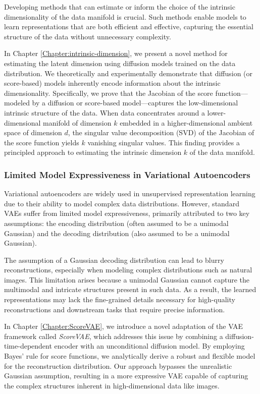 Developing methods that can estimate or inform the choice of the intrinsic dimensionality of the data manifold is crucial. Such methods enable models to learn representations that are both efficient and effective, capturing the essential structure of the data without unnecessary complexity.

In Chapter \ref{Chapter:intrinsic-dimension}, we present a novel method for estimating the latent dimension using diffusion models trained on the data distribution. We theoretically and experimentally demonstrate that diffusion (or score-based) models inherently encode information about the intrinsic dimensionality. Specifically, we prove that the Jacobian of the score function—modeled by a diffusion or score-based model—captures the low-dimensional intrinsic structure of the data. When data concentrates around a lower-dimensional manifold of dimension \( k \) embedded in a higher-dimensional ambient space of dimension \( d \), the singular value decomposition (SVD) of the Jacobian of the score function yields \( k \) vanishing singular values. This finding provides a principled approach to estimating the intrinsic dimension \( k \) of the data manifold.

\subsubsection{Limited Model Expressiveness in Variational Autoencoders}

Variational autoencoders are widely used in unsupervised representation learning due to their ability to model complex data distributions. However, standard VAEs suffer from limited model expressiveness, primarily attributed to two key assumptions: the encoding distribution (often assumed to be a unimodal Gaussian) and the decoding distribution (also assumed to be a unimodal Gaussian).

The assumption of a Gaussian decoding distribution can lead to blurry reconstructions, especially when modeling complex distributions such as natural images. This limitation arises because a unimodal Gaussian cannot capture the multimodal and intricate structures present in such data. As a result, the learned representations may lack the fine-grained details necessary for high-quality reconstructions and downstream tasks that require precise information.

In Chapter \ref{Chapter:ScoreVAE}, we introduce a novel adaptation of the VAE framework called \textit{ScoreVAE}, which addresses this issue by combining a diffusion-time-dependent encoder with an unconditional diffusion model. By employing Bayes' rule for score functions, we analytically derive a robust and flexible model for the reconstruction distribution. Our approach bypasses the unrealistic Gaussian assumption, resulting in a more expressive VAE capable of capturing the complex structures inherent in high-dimensional data like images.

